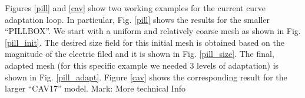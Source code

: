\documentclass[review,12pt]{elsarticle_summary_report}
\begin{document}
Figures \ref{pill} and \ref{cav} show two working examples for the current curve adaptation loop.
In particular, Fig. \ref{pill} shows the results for the smaller ``PILLBOX''. We start with a uniform and relatively coarse mesh as shown in Fig. \ref{pill_init}. The desired size field for this initial mesh is obtained based on the magnitude of the electric filed and it is shown in Fig. \ref{pill_size}. The final, adapted mesh (for this specific example we needed 3 levels of adaptation) is shown in Fig. \ref{pill_adapt}. Figure \ref{cav} shows the corresponding result for the larger ``CAV17'' model. \color{blue} Mark: More technical Info \color{black}
\begin{landscape}
\begin{figure}[ph!]
\centering
{}
\hspace*{50pt}
\\
\hspace*{50pt}

\end{figure}
\end{landscape}
\end{document}
